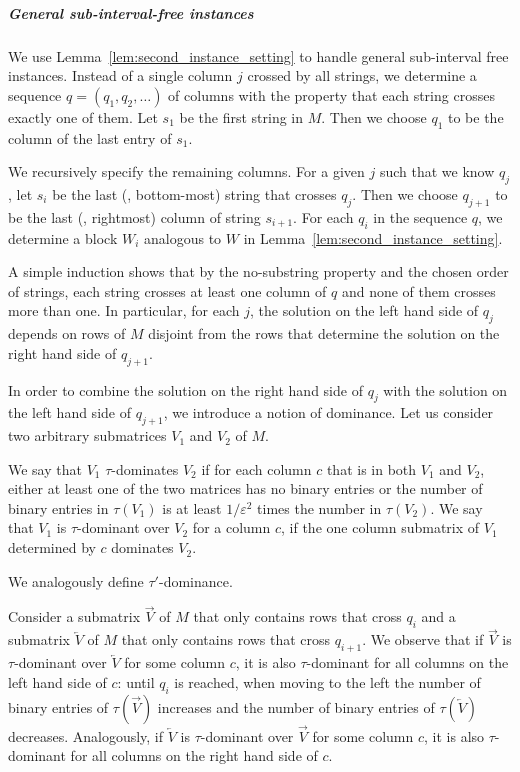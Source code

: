 \subparagraph{General sub-interval-free instances} 
We use Lemma~\ref{lem:second_instance_setting} to handle general sub-interval free instances.
Instead of a single column $j$ crossed by all strings, we determine a sequence $q = (q_1,q_2,\dotsc)$ of columns with the property that each string crosses exactly one of them.
Let $s_1$ be the first string in $M$.
Then we choose $q_1$ to be the column of the last entry of $s_1$.

We recursively specify the remaining columns.
For a given $j$ such that we know $q_j$, let $s_i$ be the last (\ie, bottom-most) string that crosses $q_j$.
Then we choose $q_{j+1}$ to be the last (\ie, rightmost) column of string $s_{i+1}$.
For each $q_i$ in the sequence $q$, we determine a block $W_i$ analogous to $W$ in Lemma~\ref{lem:second_instance_setting}.

A simple induction shows that by the no-substring property and the chosen order of strings, each string crosses at least one column of $q$ and none of them crosses more than one.
In particular, for each $j$, the solution on the left hand side of $q_j$ depends on rows of $M$ disjoint from the rows that determine the solution on the right hand side of $q_{j+1}$. 

In order to combine the solution on the right hand side of $q_j$ with the solution on the left hand side of $q_{j+1}$, we introduce a notion of dominance.
Let us consider two arbitrary submatrices $V_1$ and $V_2$ of $M$.
\begin{definition}[Dominance]
    \label{def:dominance}
    We say that $V_1$ $\tau$-dominates $V_2$ if for each column $c$ that is in both $V_1$ and $V_2$, either at least one of the two matrices has no binary entries or
    the number of binary entries in $\tau(V_1)$ is at least $1/\varepsilon^2$ times the number in $\tau(V_2)$.
    We say that $V_1$ is $\tau$-dominant over $V_2$ for a column $c$, if the one column submatrix of $V_1$ determined by $c$ dominates $V_2$. 
    
    We analogously define $\tau'$-dominance.
\end{definition}

Consider a submatrix $\overrightarrow{V}$ of $M$ that only contains rows that cross $q_i$ and a submatrix $\overleftarrow{V}$ of $M$ that only contains rows that cross $q_{i+1}$.
We observe that if $\overrightarrow{V}$ is $\tau$-dominant over $\overleftarrow{V}$ for some column $c$, it is also $\tau$-dominant for all columns on the left hand side of $c$:
until $q_i$ is reached, when moving to the left the number of binary entries of $\tau(\overrightarrow{V})$ increases and the number of binary entries of $\tau(\overleftarrow{V})$ decreases.
Analogously, if $\overleftarrow{V}$ is $\tau$-dominant over $\overrightarrow{V}$ for some column $c$, it is also $\tau$-dominant for all columns on the right hand side of $c$.

